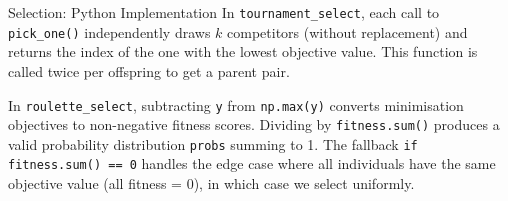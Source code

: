 \documentclass[aspectratio=169,10pt]{beamer}
\begin{document}
\begin{frame}[fragile]{Selection: Python Implementation}
  In \texttt{tournament\_select}, each call to \texttt{pick\_one()}
  independently draws $k$ competitors (without replacement) and
  returns the index of the one with the lowest objective value.
  This function is called twice per offspring to get a parent pair.

  In \texttt{roulette\_select}, subtracting \texttt{y} from
  \texttt{np.max(y)} converts minimisation objectives to non-negative
  fitness scores.  Dividing by \texttt{fitness.sum()} produces a
  valid probability distribution \texttt{probs} summing to 1.  The
  fallback \texttt{if fitness.sum() == 0} handles the edge case where
  all individuals have the same objective value (all fitness = 0),
  in which case we select uniformly.

\end{frame}
\end{document}
